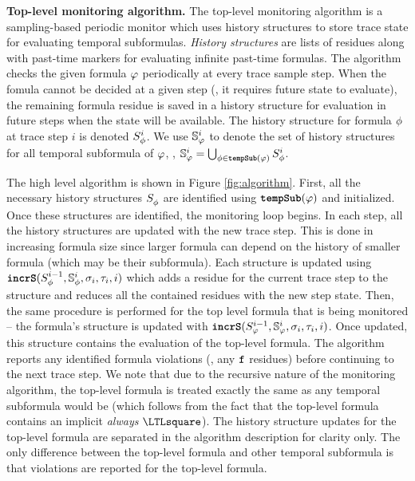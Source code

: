\textbf{Top-level monitoring algorithm.}
The top-level monitoring algorithm \monitor is a sampling-based periodic monitor which uses history structures to store trace state for evaluating temporal subformulas.
\emph{History structures} are lists of residues along with past-time markers for evaluating infinite past-time formulas.
The algorithm checks the given formula $\policy$ periodically at every trace sample step.
When the fomula cannot be decided at a given step (\eg, it requires future state to evaluate), the remaining formula residue is saved in a history structure for evaluation in future steps when the state will be available.
The history structure for formula $\policyv$ at trace step $i$ is denoted $\histst[\policyv]{i}$.
We use $\histSt[\policy]{i}$ to denote the set of history structures for all temporal subformula of $\policy$, \ie,
$\histSt[\policy]{i} = \bigcup_{\policyv \in \tempSub(\policy)} \histst[\policyv]{i}$.


The high level algorithm \monitor is shown in Figure \ref{fig:algorithm}.
%
First, all the necessary history structures $\histst[\policyv]{ }$ are identified using $\tempSub(\policy)$ and initialized.
Once these structures are identified, the monitoring loop begins.
%
In each step, all the history structures are updated with the new trace step.
This is done in increasing formula size since larger formula can depend on the history of smaller formula (which may be their subformula).
%
Each structure is updated using $\incrS(\histst[\policyv]{i-1},\histSt[\policyv]{i}, \sigma_i, \tau_i, i)$ which adds a residue for the current trace step to the structure and reduces all the contained residues with the new step state.
Then, the same procedure is performed for the top level formula that is being monitored -- the formula's structure is updated with $\incrS(\histst{i-1},\histSt{i},\sigma_i,\tau_i, i)$.
Once updated, this structure contains the evaluation of the top-level formula. The algorithm reports any identified formula violations (\ie, any $\false$ residues) before continuing to the next trace step.
%
We note that due to the recursive nature of the monitoring algorithm, the top-level formula is treated exactly the same as any temporal subformula would be (which follows from the fact that the top-level formula contains an implicit \emph{always} $\henceforth$).
The history structure updates for the top-level formula are separated in the algorithm description for clarity only.
The only difference between the top-level formula and other temporal subformula is that violations are reported for the top-level formula.




